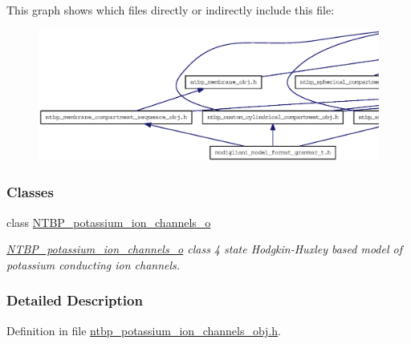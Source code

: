This graph shows which files directly or indirectly include this file:
\nopagebreak
\begin{figure}[H]
\begin{center}
\leavevmode
\includegraphics[width=400pt]{ntbp__potassium__ion__channels__obj_8h__dep__incl}
\end{center}
\end{figure}
\subsubsection*{Classes}
\begin{DoxyCompactItemize}
\item 
class \hyperlink{class_n_t_b_p__potassium__ion__channels__o}{NTBP\_\-potassium\_\-ion\_\-channels\_\-o}
\begin{DoxyCompactList}\small\item\em \hyperlink{class_n_t_b_p__potassium__ion__channels__o}{NTBP\_\-potassium\_\-ion\_\-channels\_\-o} class 4 state Hodgkin-\/Huxley based model of potassium conducting ion channels. \item\end{DoxyCompactList}\end{DoxyCompactItemize}


\subsubsection{Detailed Description}


Definition in file \hyperlink{ntbp__potassium__ion__channels__obj_8h_source}{ntbp\_\-potassium\_\-ion\_\-channels\_\-obj.h}.

